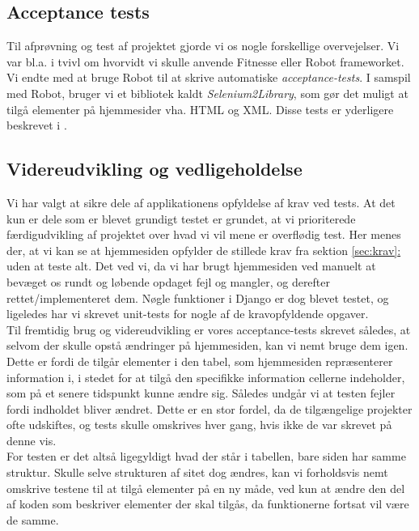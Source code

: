 \documentclass[12pt]{article}
\begin{document}
\subsection{Acceptance tests}
Til afprøvning og test af projektet gjorde vi os nogle forskellige overvejelser. Vi var bl.a. i tvivl om hvorvidt vi skulle anvende Fitnesse eller Robot frameworket. Vi endte med at bruge Robot til at skrive automatiske \textit{acceptance-tests}. I samspil med Robot, bruger vi et bibliotek kaldt \textit{Selenium2Library}, som gør det muligt at tilgå elementer på hjemmesider vha. HTML og XML.
Disse tests er yderligere beskrevet i .

\subsection{Videreudvikling og vedligeholdelse}
Vi har valgt at sikre dele af applikationens opfyldelse af krav ved tests. At det kun er dele som er blevet grundigt testet er grundet, at vi prioriterede færdigudvikling af projektet over hvad vi vil mene er overflødig test. Her menes der, at vi kan se at hjemmesiden opfylder de stillede krav fra sektion \hyperref[sec:krav]{\ref*{sec:krav}: } uden at teste alt. Det ved vi, da vi har brugt hjemmesiden ved manuelt at bevæget os rundt og løbende opdaget fejl og mangler, og derefter rettet/implementeret dem. Nøgle funktioner i Django er dog blevet testet, og ligeledes har vi skrevet unit-tests for nogle af de kravopfyldende opgaver. \\
Til fremtidig brug og videreudvikling er vores acceptance-tests skrevet således, at selvom der skulle opstå ændringer på hjemmesiden, kan vi nemt bruge dem igen. Dette er fordi de tilgår elementer i den tabel, som hjemmesiden repræsenterer information i, i stedet for at tilgå den specifikke information cellerne indeholder, som på et senere tidspunkt kunne ændre sig. Således undgår vi at testen fejler fordi indholdet bliver ændret. Dette er en stor fordel, da de tilgængelige projekter ofte udskiftes, og tests skulle omskrives hver gang, hvis ikke de var skrevet på denne vis. \\
For testen er det altså ligegyldigt hvad der står i tabellen, bare siden har samme struktur. Skulle selve strukturen af sitet dog ændres, kan vi forholdsvis nemt omskrive testene til at tilgå elementer på en ny måde, ved kun at ændre den del af koden som beskriver elementer der skal tilgås, da funktionerne fortsat vil være de samme. \\
\end{document}
